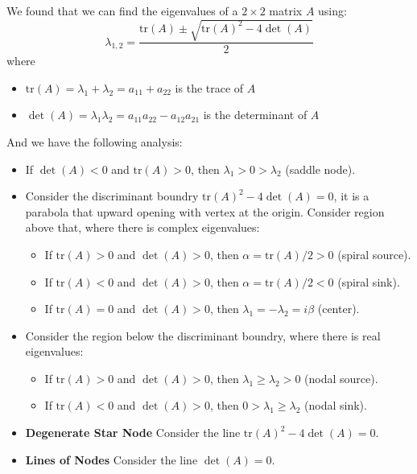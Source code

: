\documentclass[11pt]{article}
\begin{document}
\begin{definition}
    We found that we can find the eigenvalues of a \( 2 \times 2 \) matrix \( A \) using:
    $$
    \lambda_{1,2} = \frac{\text{tr}(A) \pm \sqrt{\text{tr}(A)^2 - 4\det(A)}}{2}
    $$
    where
    \begin{itemize}
        \item \( \text{tr}(A) = \lambda_1 + \lambda_2 = a_{11} + a_{22} \) is the trace of \( A \)
        \item \( \det(A) = \lambda_1 \lambda_2 = a_{11}a_{22} - a_{12}a_{21} \) is the determinant of \( A \)   
    \end{itemize}
    And we have the following analysis:
    \begin{itemize}
        \item If \( \det(A) < 0 \) and \( \text{tr}(A) > 0 \), then \( \lambda_1 > 0 > \lambda_2 \) (saddle node).
        \item Consider the discriminant boundry \( \text{tr}(A)^2 - 4\det(A) = 0 \), it is a parabola that upward opening with vertex at the origin. Consider region above that, where there is complex eigenvalues:
        \begin{itemize}
            \item If \( \text{tr}(A) > 0 \) and \( \det(A) > 0 \), then \( \alpha = \text{tr}(A)/2 > 0 \) (spiral source).
            \item If \( \text{tr}(A) < 0 \) and \( \det(A) > 0 \), then \( \alpha = \text{tr}(A)/2 < 0 \) (spiral sink).
            \item If \( \text{tr}(A) = 0 \) and \( \det(A) > 0 \), then \( \lambda_1 = -\lambda_2 = i\beta \) (center).
        \end{itemize}
        \item Consider the region below the discriminant boundry, where there is real eigenvalues:
        \begin{itemize}
            \item If \( \text{tr}(A) > 0 \) and \( \det(A) > 0 \), then \( \lambda_1 \geq \lambda_2 > 0 \) (nodal source).
            \item If \( \text{tr}(A) < 0 \) and \( \det(A) > 0 \), then \( 0 > \lambda_1 \geq \lambda_2 \) (nodal sink).
        \end{itemize}
        \item \textbf{Degenerate Star Node} Consider the line \( \text{tr}(A)^2 - 4\det(A) = 0 \).
        \item \textbf{Lines of Nodes} Consider the line \( \det(A) = 0 \).
    \end{itemize}
\end{definition}
\end{document}
